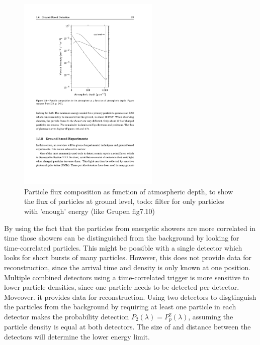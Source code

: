 \begin{figure}
    \centering
    \includegraphics[width=0.6\textwidth]
                    {plots/experiment/particle_density}
    \caption{Particle flux composition as function of atmospheric depth, to show the flux of particles at ground level, todo: filter for only particles with 'enough' energy (like Grupen fig7.10)}
    \label{fig:particle_density}
\end{figure}

By using the fact that the particles from energetic showers are more correlated in time those showers can be distinguished from the background by looking for time-correlated particles. This might be possible with a single detector which looks for short bursts of many particles. However, this does not provide data for reconstruction, since the arrival time and density is only known at one position. Multiple combined detectors using a time-correlated trigger is more sensitive to lower particle densities, since one particle needs to be detected per detector. Moveover. it provides data for reconstruction. Using two detectors to disgtinguish the particles from the background by requiring at least one particle in each detector makes the probability detection $P_2(\lambda) = P_p^2(\lambda)$, assuming the particle density is equal at both detectors. The size of and distance between the detectors will determine the lower energy limit.

